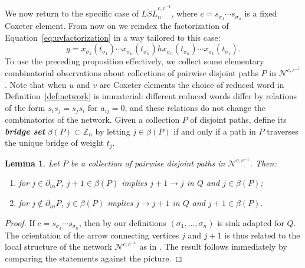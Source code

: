 \documentclass[12pt]{amsart}
\newcommand{\newword}[1]{\textbf{\emph{#1}}}
\newcommand{\ZZ}{\mathbb{Z}}
\newcommand{\cN}{\mathcal{N}} %
\newcommand{\ol}[1]{\overline{#1}}
\newtheorem{lemma}[theorem]{Lemma}
\theoremstyle{remark}
\numberwithin{equation}{section}
\numberwithin{figure}{section}
\begin{document}
We now return to the specific case of $\widetilde{LSL}_n^{c,c^{-1}}$, where $c = s_{\sigma_1}\cdots s_{\sigma_{n}}$ is a fixed Coxeter element.
From now on we reindex the factorization of Equation~\ref{eq:uvfactorization} in a way tailored to this case:
\begin{equation}
  g = x_{\ol{\sigma_1}}(t_{\ol{\sigma_1}}) \cdots x_{\ol{\sigma_n}}(t_{\ol{\sigma_n}})h x_{\sigma_n}(t_{\sigma_n}) \cdots x_{\sigma_1}(t_{\sigma_1}).
  \label{eq:coxfactorization}
\end{equation}
To use the preceding proposition effectively, we collect some elementary combinatorial observations about collections of pairwise disjoint paths $P$ in $\cN^{c,c^{-1}}$.
Note that when $u$ and $v$ are Coxeter elements the choice of reduced word in Definition~\ref{def:network} is immaterial: different reduced words differ by relations of the form $s_i s_j = s_j s_i$ for $a_{ij} = 0$, and these relations do not change the combinatorics of the network.
Given a collection $P$ of disjoint paths, define its \newword{bridge set} $\beta(P)\subset\ZZ_n$ by letting $j\in\beta(P)$ if and only if a path in $P$ traverses the unique bridge of weight $t_j$.

\begin{lemma}
  \label{lem:phi}
  Let $P$ be a collection of pairwise disjoint paths in $\cN^{c,c^{-1}}$.  Then:
  \begin{enumerate}
    \item for $j\in\partial_{in}P$, $j+1\in\beta(P)$ implies $j+1\to j$ in $Q$ and $j\in\beta(P)$;
    \item for $j\notin\partial_{in}P$, $j\in\beta(P)$ implies $j\to j+1$ in $Q$ and $j+1\in\beta(P)$.
  \end{enumerate}
\end{lemma}
\begin{proof}
  If $c = s_{\sigma_1}\cdots s_{\sigma_{n}}$, then by our definitions $(\sigma_1,\ldots,\sigma_{n})$ is sink adapted for $Q$.
  The orientation of the arrow connecting vertices $j$ and $j+1$ is thus related to the local structure of the network $\cN^{c,c^{-1}}$ as in .
  The result follows immediately by comparing the statements against the picture.
\end{proof} 
\end{document}
